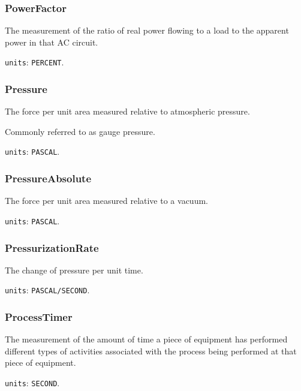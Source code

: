 \subsubsection{PowerFactor}
\label{sec:PowerFactor}



The measurement of the ratio of real power flowing to a load to the apparent power in that AC circuit.


\texttt{units}: \texttt{PERCENT}.


\subsubsection{Pressure}
\label{sec:Pressure}



The force per unit area measured relative to atmospheric pressure. 

Commonly referred to as gauge pressure.


\texttt{units}: \texttt{PASCAL}.


\subsubsection{PressureAbsolute}
\label{sec:PressureAbsolute}



The force per unit area measured relative to a vacuum.


\texttt{units}: \texttt{PASCAL}.


\subsubsection{PressurizationRate}
\label{sec:PressurizationRate}



The change of pressure per unit time.


\texttt{units}: \texttt{PASCAL/SECOND}.


\subsubsection{ProcessTimer}
\label{sec:ProcessTimer}



The measurement of the amount of time a piece of equipment has performed different types of activities associated with the process being performed at that piece of equipment.


\texttt{units}: \texttt{SECOND}.

